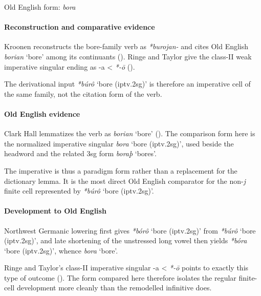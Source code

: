 \documentclass[
  british,
  a4paper,
]{article}
\providecommand{\Recon}[1]{\emph{*#1}}
\begin{document}
Old English form: \emph{bora}

\paragraph{Reconstruction and comparative
evidence}\label{reconstruction-and-comparative-evidence-136}

Kroonen reconstructs the bore-family verb as \emph{*burojan-} and cites
Old English {\emph{borian}} `bore' among its continuants
(). Ringe and Taylor give
the class-II weak imperative singular ending as -a \textless{}
\emph{*-ō} ().

The derivational input \Recon{búrô} `bore (iptv.2sg)' is therefore an
imperative cell of the same family, not the citation form of the verb.

\paragraph{Old English evidence}\label{old-english-evidence-136}

Clark Hall lemmatizes the verb as {\emph{borian}} `bore'
(). The comparison form
here is the normalized imperative singular \emph{bora} `bore
(iptv.2sg)', used beside the headword and the related 3sg form
\emph{boraþ} `bores'.

The imperative is thus a paradigm form rather than a replacement for the
dictionary lemma. It is the most direct Old English comparator for the
non-\emph{j} finite cell represented by \Recon{búrô} `bore (iptv.2sg)'.

\paragraph{Development to Old
English}\label{development-to-old-english-136}

Northwest Germanic lowering first gives \Recon{bórô} `bore (iptv.2sg)'
from \Recon{búrô} `bore (iptv.2sg)', and late shortening of the
unstressed long vowel then yields \Recon{bóra} `bore (iptv.2sg)', whence
\emph{bora} `bore'.

Ringe and Taylor's class-II imperative singular -a \textless{}
\emph{*-ō} points to exactly this type of outcome
(). The form
compared here therefore isolates the regular finite-cell development
more cleanly than the remodelled infinitive does.
\end{document}
